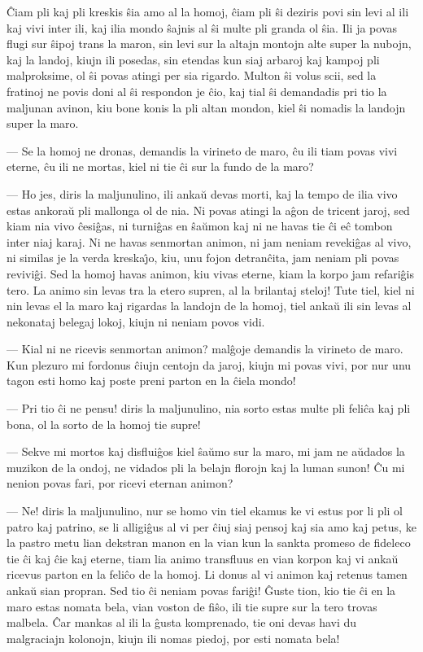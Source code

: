    \^Ciam pli kaj pli kreskis \^sia amo al la homoj, \^ciam pli \^si deziris
povi sin levi al ili kaj vivi inter ili, kaj ilia mondo \^sajnis al
\^si multe pli granda ol \^sia. Ili ja povas flugi sur \^sipoj trans
la maron, sin levi sur la altajn montojn alte super la nubojn, kaj
la landoj, kiujn ili posedas, sin etendas kun siaj arbaroj kaj
kampoj pli malproksime, ol \^si povas atingi per sia rigardo. Multon
\^si volus scii, sed la fratinoj ne povis doni al \^si respondon je
\^cio, kaj tial \^si demandadis pri tio la maljunan avinon, kiu bone
konis la pli altan mondon, kiel \^si nomadis la landojn super la
maro.

 --- Se la homoj ne dronas, demandis la virineto de maro, \^cu ili tiam
povas vivi eterne, \^cu ili ne mortas, kiel ni tie \^ci sur la fundo
de la maro?

 --- Ho jes, diris la maljunulino, ili anka\u u devas morti, kaj la tempo
de ilia vivo estas ankora\u u pli mallonga ol de nia. Ni povas
atingi la a\^gon de tricent jaroj, sed kiam nia vivo \^cesi\^gas, ni
turni\^gas en \^sa\u umon kaj ni ne havas tie \^ci e\^c tombon inter
niaj karaj. Ni ne havas senmortan animon, ni jam neniam reveki\^gas
al vivo, ni similas je la verda kreska\^{\j}o, kiu, unu fojon
detran\^cita, jam neniam pli povas revivi\^gi. Sed la homoj havas
animon, kiu vivas eterne, kiam la korpo jam refari\^gis tero. La
animo sin levas tra la etero supren, al la brilantaj steloj! Tute
tiel, kiel ni nin levas el la maro kaj rigardas la landojn de la
homoj, tiel anka\u u ili sin levas al nekonataj belegaj lokoj, kiujn
ni neniam povos vidi.

 --- Kial ni ne ricevis senmortan animon? mal\^goje demandis la virineto
de maro. Kun plezuro mi fordonus \^ciujn centojn da jaroj, kiujn mi
povas vivi, por nur unu tagon esti homo kaj poste preni parton en la
\^ciela mondo!

 --- Pri tio \^ci ne pensu! diris la maljunulino, nia sorto estas multe
pli feli\^ca kaj pli bona, ol la sorto de la homoj tie supre!

 --- Sekve mi mortos kaj disflui\^gos kiel \^sa\u umo sur la maro, mi jam
ne a\u udados la muzikon de la ondoj, ne vidados pli la belajn
florojn kaj la luman sunon! \^Cu mi nenion povas fari, por ricevi
eternan animon?

 --- Ne! diris la maljunulino, nur se homo vin tiel ekamus ke vi estus
por li pli ol patro kaj patrino, se li alligi\^gus al vi per \^ciuj
siaj pensoj kaj sia amo kaj petus, ke la pastro metu lian dekstran
manon en la vian kun la sankta promeso de fideleco tie \^ci kaj
\^cie kaj eterne, tiam lia animo transfluus en vian korpon kaj vi
anka\u u ricevus parton en la feli\^co de la homoj. Li donus al vi
animon kaj retenus tamen anka\u u sian propran. Sed tio \^ci neniam
povas fari\^gi! \^Guste tion, kio tie \^ci en la maro estas nomata
bela, vian voston de fi\^so, ili tie supre sur la tero trovas
malbela. \^Car mankas al ili la \^gusta komprenado, tie oni devas
havi du malgraciajn kolonojn, kiujn ili nomas piedoj, por esti
nomata bela!

